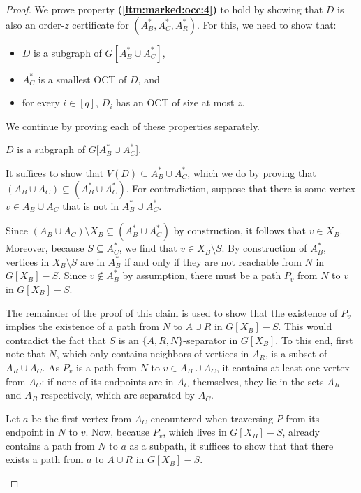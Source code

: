 \begin{proof}
	We prove property \textbf{(\ref{itm:marked:occ:4})} to hold by showing that $D$ is also an order-$z$ certificate for $(A_B^\ast, A_C^\ast, A_R^\ast)$. For this, we need to show that: 
	\begin{itemize}
		\item $D$ is a subgraph of $G[A_B^\ast \cup A_C^\ast]$,
		\item $A_C^\ast$ is a smallest OCT of $D$, and
		\item for every $i \in [q]$, $D_i$ has an OCT of size at most $z$.
	\end{itemize}
	We continue by proving each of these properties separately.
	\begin{claim}
		$D$ is a subgraph of $G[A_B^\ast \cup A_C^\ast$].
	\end{claim}
	\begin{claimproof}
		It suffices to show that $V(D) \subseteq A_B^\ast \cup A_C^\ast$, which we do by proving that $(A_B \cup A_C) \subseteq (A_B^\ast \cup A_C^\ast)$. For contradiction, suppose that there is some vertex $v \in A_B \cup A_C$ that is not in $A_B^\ast \cup A_C^\ast$. 
		
		Since $(A_B \cup A_C) \setminus X_B \subseteq (A_B^\ast \cup A_C^\ast)$ by construction, it follows that $v \in X_B$. Moreover, because $S \subseteq A_C^\ast$, we find that $v \in X_B \setminus S$. By construction of $A_B^\ast$, vertices in $X_B \setminus S$ are in $A_B^\ast$ if and only if they are not reachable from $N$ in $G[X_B] - S$. Since $v \notin A_B^\ast$ by assumption, there must be a path $P_v$ from $N$ to $v$ in $G[X_B] - S$.
		
		The remainder of the proof of this claim is used to show that the existence of $P_v$ implies the existence of a path from $N$ to $A \cup R$ in $G[X_B] - S$. This would contradict the fact that $S$ is an $\{A, R, N\}$-separator in $G[X_B]$. To this end, first note that $N$, which only contains neighbors of vertices in $A_R$, is a subset of $A_R \cup A_C$. As $P_v$ is a path from $N$ to $v \in A_B \cup A_C$, it contains at least one vertex from $A_C$: if none of its endpoints are in $A_C$ themselves, they lie in the sets $A_R$ and $A_B$ respectively, which are separated by $A_C$.
		
		Let $a$ be the first vertex from $A_C$ encountered when traversing $P$ from its endpoint in $N$ to $v$. Now, because $P_v$, which lives in $G[X_B] - S$, already contains a path from $N$ to $a$ as a subpath, it suffices to show that that there exists a path from $a$ to $A \cup R$ in $G[X_B] - S$.
		

\end{claimproof}
\end{proof}
